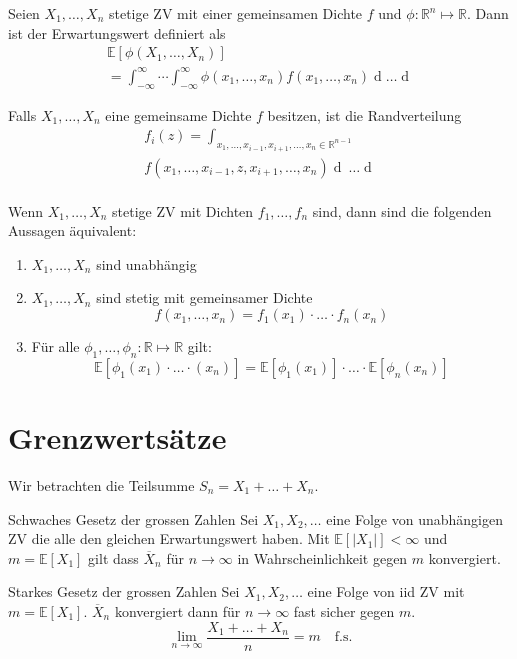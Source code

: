 \documentclass[a4paper,10pt]{article}
\def\R{\mathbb{R}}
\def\E{\mathbb{E}}
\begin{document}
Seien \(X_1, \ldots, X_n\) stetige ZV mit einer gemeinsamen Dichte \(f\) und \(\phi: \R^n \mapsto \R\). Dann ist der Erwartungswert definiert als
\begin{align*}
	\E[\phi(X_1, \ldots, X_n)] \\= \int_{-\infty}^\infty \cdots \int_{-\infty}^\infty \phi(x_1, \ldots, x_n) f(x_1, \ldots, x_n) \mathop{dx_n} \ldots \mathop{dx_1}
\end{align*}

Falls \(X_1, \ldots, X_n\) eine gemeinsame Dichte \(f\) besitzen, ist die Randverteilung
\begin{align*}
	f_i(z) = \int_{x_1, \ldots, x_{i-1}, x_{i+1}, \ldots, x_n \in \R^{n-1}}               \\
	f(x_1, \ldots, x_{i-1}, z, x_{i+1}, \ldots, x_n) \mathop{dx_n} \ \ldots \mathop{dx_1} \\
\end{align*}

Wenn \(X_1, \ldots, X_n\) stetige ZV mit Dichten \(f_1, \ldots, f_n\) sind, dann sind die folgenden Aussagen äquivalent:
\begin{enumerate}
	\item \(X_1, \ldots, X_n\) sind unabhängig
	\item \(X_1, \ldots, X_n\) sind stetig mit gemeinsamer Dichte
	      \[f(x_1, \ldots, x_n) = f_1(x_1) \cdot \ldots \cdot f_n(x_n)\]
	\item Für alle \(\phi_1, \ldots, \phi_n: \R \mapsto \R\) gilt:
	      \[\E[\phi_1 (x_1)\cdot \ldots\cdot (x_n)] = \E[\phi_1(x_1)] \cdot \ldots \cdot \E[\phi_n(x_n)]\]
\end{enumerate}

\section{Grenzwertsätze}
 Wir betrachten die Teilsumme \(S_n = X_1 + \ldots + X_n\).
\begin{mainbox}{Schwaches Gesetz der grossen Zahlen}
	Sei \(X_1, X_2, \ldots\) eine Folge von unabhängigen ZV die alle den gleichen Erwartungswert haben. Mit \(\E[|X_1|] < \infty\) und \(m = \E[X_1]\) gilt dass $\overline{X}_n$ für $n \to \infty$ in Wahrscheinlichkeit gegen $m$ konvergiert.
\end{mainbox}

\begin{mainbox}{Starkes Gesetz der grossen Zahlen}
	Sei $X_1, X_2, \ldots$ eine Folge von iid ZV mit $m = \E[X_1]$. $\overline{X}_n$ konvergiert dann für $n \to \infty$ fast sicher gegen $m$.
	$$
	\lim_{n\to \infty} \frac{X_1 + \ldots + X_n}{n} = m \quad \text{f.s.}
	$$
\end{mainbox}
\end{document}
